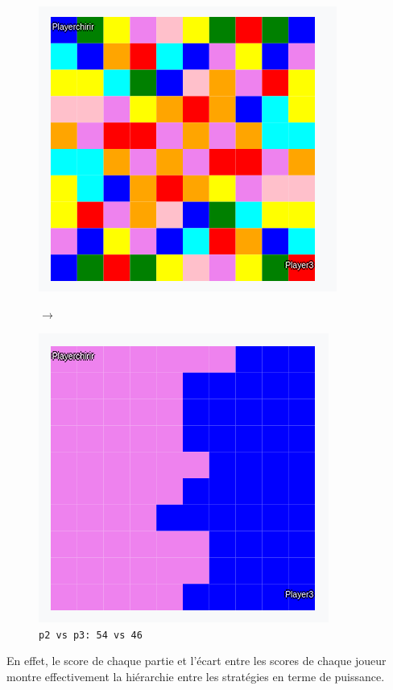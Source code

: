 \documentclass[11pt]{article}
\begin{document}
\begin{figure}[h!]
    \centering
    \begin{minipage}[c]{.46\linewidth}
        \centering
        \includegraphics[scale=0.3]{img/3_vs_chirir.png}
    \end{minipage}
    $\longrightarrow$
    \begin{minipage}[c]{.46\linewidth}
        \centering
        \includegraphics[scale=0.3]{img/3_vs_chirir_end.png}
    \end{minipage}
    \caption{\texttt{p2 vs p3: 54 vs 46}}
\end{figure}

En effet, le score de chaque partie et l'écart entre les scores de chaque joueur montre effectivement la hiérarchie entre les stratégies en terme de puissance.
\end{document}

